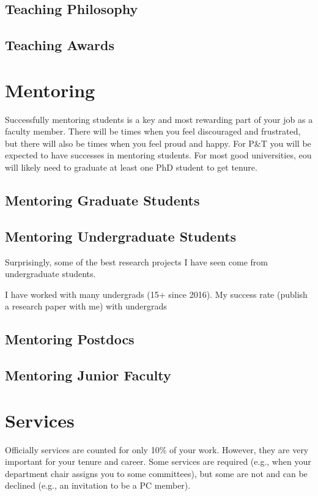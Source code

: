\documentclass[oneside,11pt,dvipsnames]{book}
\begin{document}
\section{Teaching Philosophy}
\section{Teaching Awards}



\chapter{Mentoring}

Successfully mentoring students is a key and most rewarding part of your job as a faculty member. 
There will be times when you feel discouraged and frustrated, but there will also be times when you feel proud and happy.  
For P\&T you will be expected to have successes in mentoring students.  For most good universities, eou will likely need to graduate at least one PhD student to get tenure.

\section{Mentoring Graduate Students}


\section{Mentoring Undergraduate Students}
Surprisingly, some of the best research projects I have seen come from undergraduate students.  


I have worked with many undergrads (15+ since 2016). My success rate (publish a research paper with me) with undergrads 


\section{Mentoring Postdocs}
\section{Mentoring Junior Faculty}

\chapter{Services}\label{sec:services}


Officially services are counted for only 10\% of your work. However, they are very important for your tenure and career.
Some services are required (e.g., when your department chair assigns you to some committees), but some are not and can be declined (e.g., an invitation to be a PC member).  
\end{document}
